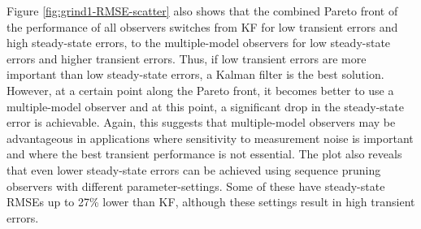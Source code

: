 Figure \ref{fig:grind1-RMSE-scatter} also shows that the combined Pareto front of the performance of all observers switches from \gls{KF} for low transient errors and high steady-state errors, to the multiple-model observers for low steady-state errors and higher transient errors. Thus, if low transient errors are more important than low steady-state errors, a Kalman filter is the best solution. However, at a certain point along the Pareto front, it becomes better to use a multiple-model observer and at this point, a significant drop in the steady-state error is achievable. Again, this suggests that multiple-model observers may be advantageous in applications where sensitivity to measurement noise is important and where the best transient performance is not essential. The plot also reveals that even lower steady-state errors can be achieved using sequence pruning observers with different parameter-settings. Some of these have steady-state \gls{RMSE}s up to 27\% lower than \gls{KF}, although these settings result in high transient errors.

